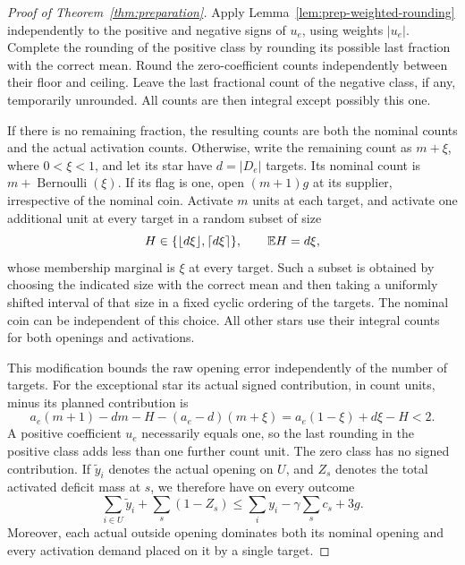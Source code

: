 \begin{proof}[Proof of Theorem~\ref{thm:preparation}]
Apply Lemma~\ref{lem:prep-weighted-rounding} independently to the
positive and negative signs of $u_e$, using weights $|u_e|$.  Complete
the rounding of the positive class by rounding its possible last
fraction with the correct mean.  Round the zero-coefficient counts
independently between their floor and ceiling.  Leave the last
fractional count of the negative class, if any, temporarily unrounded.
All counts are then integral except possibly this one.

If there is no remaining fraction, the resulting counts are both the
nominal counts and the actual activation counts.  Otherwise, write the
remaining count as $m+\xi$, where $0<\xi<1$, and let its star have
$d=|D_e|$ targets.  Its nominal count is $m+\operatorname{Bernoulli}(\xi)$.
If its flag is one, open $(m+1)g$ at its supplier, irrespective of the
nominal coin.  Activate $m$ units at each target, and activate one
additional unit at every target in a random subset of size
\[
 H\in\{\lfloor d\xi\rfloor,\lceil d\xi\rceil\},
 \qquad \mathbb E H=d\xi,
\]
whose membership marginal is $\xi$ at every target.  Such a subset is
obtained by choosing the indicated size with the correct mean and
then taking a uniformly shifted interval of that size in a fixed
cyclic ordering of the targets.  The nominal coin can be independent
of this choice.  All other stars use their integral counts for both
openings and activations.

This modification bounds the raw opening error independently of the
number of targets.  For the exceptional star its actual signed
contribution, in count units, minus its planned contribution is
\[
 a_e(m+1)-dm-H-(a_e-d)(m+\xi)
 =a_e(1-\xi)+d\xi-H<2.
\]
A positive coefficient $u_e$ necessarily equals one, so the last
rounding in the positive class adds less than one further count unit.
The zero class has no signed contribution.  If $\widetilde y_i$ denotes
the actual opening on $U$, and $Z_s$ denotes the total activated deficit
mass at $s$, we therefore have on every outcome
\begin{equation}\label{eq:prep-raw-bound}
 \sum_{i\in U}\widetilde y_i+\sum_s(1-Z_s)
 \le\sum_i y_i-\gamma\sum_s c_s+3g.
\end{equation}
Moreover, each actual outside opening dominates both its nominal
opening and every activation demand placed on it by a single target.


\end{proof}
